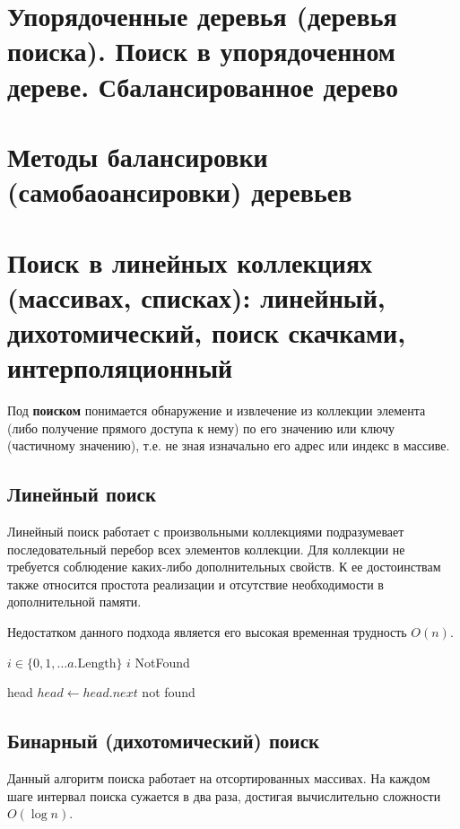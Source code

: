 \section{Упорядоченные деревья (деревья поиска). Поиск в упорядоченном дереве.  Сбалансированное дерево}
\section{Методы балансировки (самобаоансировки) деревьев}
\section{Поиск в линейных коллекциях (массивах, списках): линейный, дихотомический, поиск скачками, интерполяционный}
Под \textbf{поиском} понимается обнаружение и извлечение из коллекции элемента
(либо получение прямого доступа к нему) по его значению или
ключу (частичному значению), т.е. не зная изначально его адрес
или индекс в массиве.

\subsection{Линейный поиск}
Линейный поиск работает с произвольными коллекциями подразумевает последовательный перебор всех
элементов коллекции. Для коллекции не требуется соблюдение каких-либо дополнительных свойств.
К ее достоинствам также относится простота реализации и отсутствие необходимости в дополнительной
памяти.

Недостатком данного подхода является его высокая временная трудность $O(n)$.

\begin{algorithmic}
  \ForAll $i \in \{0, 1, \dots a.\textrm{Length}\}$
      \State \Return $i$
    \EndIf
  \EndFor
  \Return NotFound
\EndFunction

  \Repeat
      \State \Return head
    \EndIf
    $head \gets head.next$
  \Return not found
\EndFunction
\end{algorithmic}

\subsection{Бинарный (дихотомический) поиск}
Данный алгоритм поиска работает на отсортированных массивах. На каждом
шаге интервал поиска сужается в два раза, достигая вычислительно сложности $O(\log n)$.

